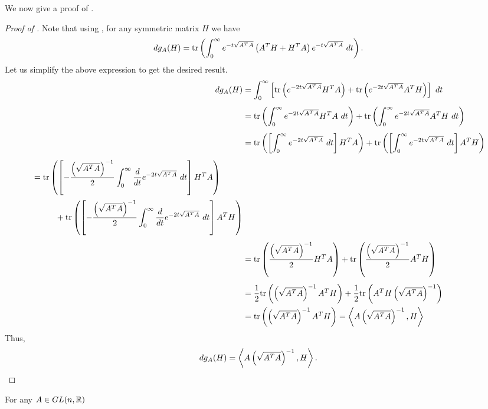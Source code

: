 \vspace{0.3cm}
\noindent We now give a proof of .
\begin{proof}[Proof of ]
    Note that using , for any symmetric matrix $H$ we have
    \begin{equation}\label{eq:derivativeOfSquareRoot}
        dg_A(H) = \mathrm{tr}\left( \int_0^\infty e^{-t\sqrt{A^TA}}\left( A^TH+H^TA \right)e^{-t\sqrt{A^TA}}~dt \right).
    \end{equation}
    Let us simplify the above expression to get the desired result.
    \begin{align*}
        dg_A(H) & = \int_0^\infty \left[ \mathrm{tr}\left( e^{-2t\sqrt{A^TA}}H^TA \right) + \mathrm{tr}\left( e^{-2t\sqrt{A^TA}}A^TH \right) \right]~dt
        \\[1ex] 
        & = \mathrm{tr}\left( \int_0^\infty e^{-2t \sqrt{A^TA}}H^TA~dt \right) + \mathrm{tr}\left( \int_0^\infty e^{-2t \sqrt{A^TA}}A^TH~dt \right)
        \\[1ex]
        & = \mathrm{tr}\left( \left[ \int_0^\infty e^{-2t \sqrt{A^TA}}~dt \right]H^TA \right) + \mathrm{tr}\left( \left[ \int_0^\infty e^{-2t \sqrt{A^TA}}~dt \right]A^TH \right)
        \\[1ex]
        \begin{split}
            & = \mathrm{tr}\left( \left[ -\dfrac{\left( \sqrt{A^TA} \right)^{-1}}{2} \int_0^\infty \dfrac{d}{dt}e^{-2t\sqrt{A^TA}}~dt \right]H^TA \right) 
            \\[0.5ex]
            & \kern 1cm + \mathrm{tr}\left( \left[ -\dfrac{\left( \sqrt{A^TA} \right)^{-1}}{2} \int_0^\infty \dfrac{d}{dt}e^{-2t\sqrt{A^TA}}~dt \right]A^TH \right)
        \end{split}
        \\[1ex]
        & = \mathrm{tr}\left( \dfrac{\left( \sqrt{A^TA} \right)^{-1}}{2}H^TA \right)  + \mathrm{tr}\left( \dfrac{\left( \sqrt{A^TA} \right)^{-1}}{2}A^TH \right)
        \\[1ex]
        & =  \dfrac{1}{2} \mathrm{tr}\left( \left( \sqrt{A^TA} \right)^{-1}A^TH \right) + \dfrac{1}{2}  \mathrm{tr}\left( A^TH\left( \sqrt{A^TA} \right)^{-1} \right)
        \\
        & =  \mathrm{tr}\left( \left( \sqrt{A^TA} \right)^{-1}A^TH \right)
         = \left\langle A\left( \sqrt{A^TA} \right)^{-1},H\right\rangle
    \end{align*}
    Thus, 
    \begin{equation*} \label{differentialOfSquareRootFinal}
	    dg_A(H) = \left\langle A\left( \sqrt{A^TA} \right)^{-1},H\right\rangle.
    \end{equation*}
\end{proof}
\vspace{0.3cm}
\hspace*{0.5cm}For  any $A\in GL(n,\mathbb{R})$
